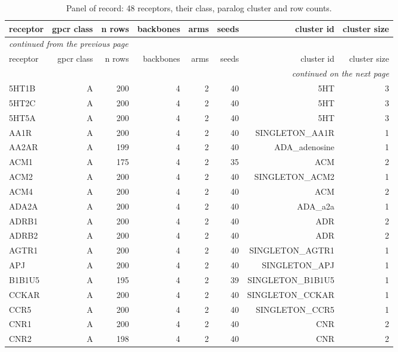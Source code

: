 \begingroup\footnotesize\setlength{\tabcolsep}{3pt}
\begin{longtable}{lrrrrrrr}
\caption{Panel of record: 48 receptors, their class, paralog cluster and row counts.}
\label{tab:t1_panel_composition}\\
\toprule
receptor & gpcr class & n rows & backbones & arms & seeds & cluster id & cluster size \\
\midrule
\endfirsthead
\multicolumn{8}{l}{\scriptsize\itshape continued from the previous page}\\
\toprule
receptor & gpcr class & n rows & backbones & arms & seeds & cluster id & cluster size \\
\midrule
\endhead
\midrule
\multicolumn{8}{r}{\scriptsize\itshape continued on the next page}\\
\endfoot
\bottomrule
\endlastfoot
5HT1B & A & 200 & 4 & 2 & 40 & 5HT & 3 \\
5HT2C & A & 200 & 4 & 2 & 40 & 5HT & 3 \\
5HT5A & A & 200 & 4 & 2 & 40 & 5HT & 3 \\
AA1R & A & 200 & 4 & 2 & 40 & SINGLETON\_AA1R & 1 \\
AA2AR & A & 199 & 4 & 2 & 40 & ADA\_adenosine & 1 \\
ACM1 & A & 175 & 4 & 2 & 35 & ACM & 2 \\
ACM2 & A & 200 & 4 & 2 & 40 & SINGLETON\_ACM2 & 1 \\
ACM4 & A & 200 & 4 & 2 & 40 & ACM & 2 \\
ADA2A & A & 200 & 4 & 2 & 40 & ADA\_a2a & 1 \\
ADRB1 & A & 200 & 4 & 2 & 40 & ADR & 2 \\
ADRB2 & A & 200 & 4 & 2 & 40 & ADR & 2 \\
AGTR1 & A & 200 & 4 & 2 & 40 & SINGLETON\_AGTR1 & 1 \\
APJ & A & 200 & 4 & 2 & 40 & SINGLETON\_APJ & 1 \\
B1B1U5 & A & 195 & 4 & 2 & 39 & SINGLETON\_B1B1U5 & 1 \\
CCKAR & A & 200 & 4 & 2 & 40 & SINGLETON\_CCKAR & 1 \\
CCR5 & A & 200 & 4 & 2 & 40 & SINGLETON\_CCR5 & 1 \\
CNR1 & A & 200 & 4 & 2 & 40 & CNR & 2 \\
CNR2 & A & 198 & 4 & 2 & 40 & CNR & 2 \\

\end{longtable}
